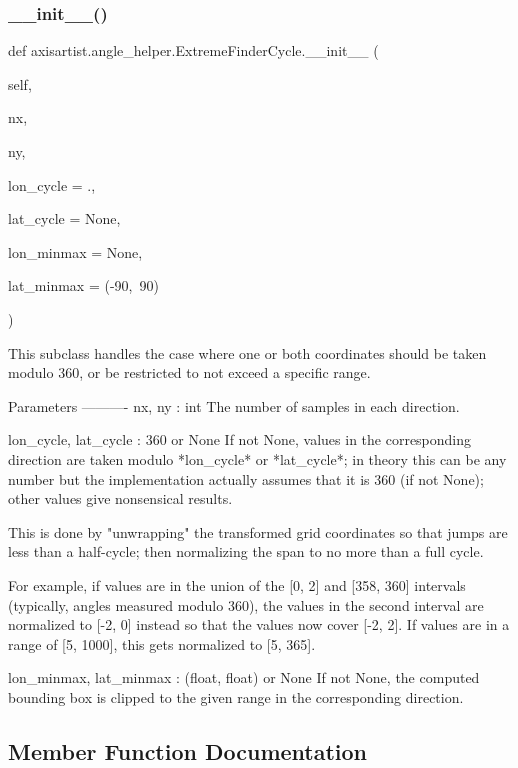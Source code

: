 \subsubsection{\texorpdfstring{\+\_\+\+\_\+init\+\_\+\+\_\+()}{\_\_init\_\_()}}
{\footnotesize\ttfamily def axisartist.\+angle\+\_\+helper.\+Extreme\+Finder\+Cycle.\+\_\+\+\_\+init\+\_\+\+\_\+ (\begin{DoxyParamCaption}\item[{}]{self,  }\item[{}]{nx,  }\item[{}]{ny,  }\item[{}]{lon\+\_\+cycle = {.},  }\item[{}]{lat\+\_\+cycle = {\ttfamily None},  }\item[{}]{lon\+\_\+minmax = {\ttfamily None},  }\item[{}]{lat\+\_\+minmax = {\ttfamily (-\/90,~90)} }\end{DoxyParamCaption})}

\begin{DoxyVerb}This subclass handles the case where one or both coordinates should be
taken modulo 360, or be restricted to not exceed a specific range.

Parameters
----------
nx, ny : int
    The number of samples in each direction.

lon_cycle, lat_cycle : 360 or None
    If not None, values in the corresponding direction are taken modulo
    *lon_cycle* or *lat_cycle*; in theory this can be any number but
    the implementation actually assumes that it is 360 (if not None);
    other values give nonsensical results.

    This is done by "unwrapping" the transformed grid coordinates so
    that jumps are less than a half-cycle; then normalizing the span to
    no more than a full cycle.

    For example, if values are in the union of the [0, 2] and
    [358, 360] intervals (typically, angles measured modulo 360), the
    values in the second interval are normalized to [-2, 0] instead so
    that the values now cover [-2, 2].  If values are in a range of
    [5, 1000], this gets normalized to [5, 365].

lon_minmax, lat_minmax : (float, float) or None
    If not None, the computed bounding box is clipped to the given
    range in the corresponding direction.
\end{DoxyVerb}
 

\subsection{Member Function Documentation}
\mbox{\label{classaxisartist_1_1angle__helper_1_1ExtremeFinderCycle_a3c017e0932e1df8c7e3effec0d4045e6}} 
